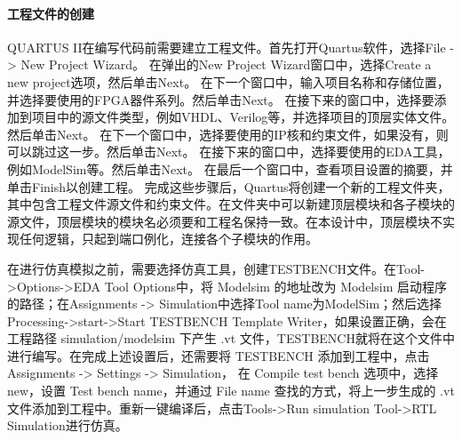     \paragraph{工程文件的创建}
    QUARTUS II在编写代码前需要建立工程文件。首先打开Quartus软件，选择File -> New Project Wizard。
    在弹出的New Project Wizard窗口中，选择Create a new project选项，然后单击Next。
    在下一个窗口中，输入项目名称和存储位置，并选择要使用的FPGA器件系列。然后单击Next。
    在接下来的窗口中，选择要添加到项目中的源文件类型，例如VHDL、Verilog等，并选择项目的顶层实体文件。然后单击Next。
    在下一个窗口中，选择要使用的IP核和约束文件，如果没有，则可以跳过这一步。然后单击Next。
    在接下来的窗口中，选择要使用的EDA工具，例如ModelSim等。然后单击Next。
    在最后一个窗口中，查看项目设置的摘要，并单击Finish以创建工程。
    完成这些步骤后，Quartus将创建一个新的工程文件夹，其中包含工程文件源文件和约束文件。在文件夹中可以新建顶层模块和各子模块的源文件，顶层模块的模块名必须要和工程名保持一致。在本设计中，顶层模块不实现任何逻辑，只起到端口例化，连接各个子模块的作用。\par
    在进行仿真模拟之前，需要选择仿真工具，创建TESTBENCH文件。在Tool->Options->EDA Tool Options中，将 Modelsim 的地址改为 Modelsim 启动程序的路径；在Assignments -> Simulation中选择Tool name为ModelSim；然后选择Processing->start->Start TESTBENCH Template Writer，如果设置正确，会在工程路径 simulation/modelsim 下产生 .vt 文件，TESTBENCH就将在这个文件中进行编写。在完成上述设置后，还需要将 TESTBENCH 添加到工程中，点击Assignments -> Settings -> Simulation，
    在 Compile test bench 选项中，选择 new，设置 Test bench name，并通过 File name 查找的方式，将上一步生成的 .vt 文件添加到工程中。重新一键编译后，点击Tools->Run simulation Tool->RTL Simulation进行仿真。
    

